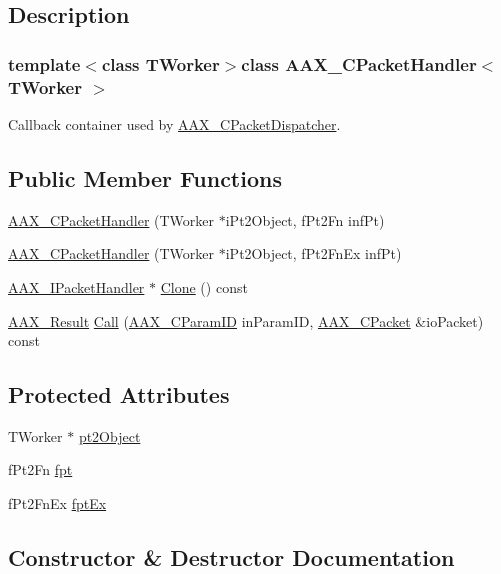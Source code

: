 \subsection{Description}
\subsubsection*{template$<$class T\+Worker$>$class A\+A\+X\+\_\+\+C\+Packet\+Handler$<$ T\+Worker $>$}

Callback container used by \hyperlink{a00031}{A\+A\+X\+\_\+\+C\+Packet\+Dispatcher}. \subsection*{Public Member Functions}
\begin{DoxyCompactItemize}
\item 
\hyperlink{a00032_a9199efa88f418df9c8e5caade283c147}{A\+A\+X\+\_\+\+C\+Packet\+Handler} (T\+Worker $\ast$i\+Pt2\+Object, f\+Pt2\+Fn inf\+Pt)
\item 
\hyperlink{a00032_aed86dcf0713ac1a983f6795170812c52}{A\+A\+X\+\_\+\+C\+Packet\+Handler} (T\+Worker $\ast$i\+Pt2\+Object, f\+Pt2\+Fn\+Ex inf\+Pt)
\item 
\hyperlink{a00106}{A\+A\+X\+\_\+\+I\+Packet\+Handler} $\ast$ \hyperlink{a00032_a8231bba45c198cb58bd6b502b4cf7aa5}{Clone} () const 
\item 
\hyperlink{a00149_a4d8f69a697df7f70c3a8e9b8ee130d2f}{A\+A\+X\+\_\+\+Result} \hyperlink{a00032_ac5f2653f2f4225aa8b4401b6247b18f9}{Call} (\hyperlink{a00149_a1440c756fe5cb158b78193b2fc1780d1}{A\+A\+X\+\_\+\+C\+Param\+I\+D} in\+Param\+I\+D, \hyperlink{a00030}{A\+A\+X\+\_\+\+C\+Packet} \&io\+Packet) const 
\end{DoxyCompactItemize}
\subsection*{Protected Attributes}
\begin{DoxyCompactItemize}
\item 
T\+Worker $\ast$ \hyperlink{a00032_ab9a5f88d1159060f5532aafb730dd861}{pt2\+Object}
\item 
f\+Pt2\+Fn \hyperlink{a00032_a9350d1cc36f20c821c90d2372219561f}{fpt}
\item 
f\+Pt2\+Fn\+Ex \hyperlink{a00032_aca6624820388e64f13d1b824dde033f5}{fpt\+Ex}
\end{DoxyCompactItemize}


\subsection{Constructor \& Destructor Documentation}
\hypertarget{a00032_a9199efa88f418df9c8e5caade283c147}{}
